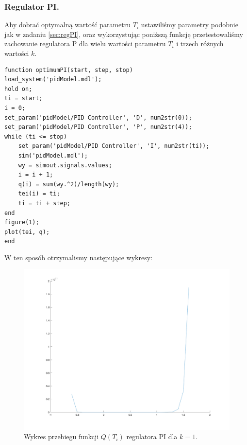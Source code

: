 \documentclass[a4paper,10pt]{article}
\begin{document}
\subsubsection{Regulator PI.}\label{sec:optPI}
Aby dobrać optymalną wartość parametru $T_{i}$ ustawiliśmy parametry podobnie jak w zadaniu \ref{sec:regPI}, oraz wykorzystując poniższą funkcję przetestowaliśmy zachowanie regulatora P dla wielu wartości parametru $T_{i}$ i trzech różnych wartości $k$. \\
\begin{lstlisting}[caption=Funkcja testująca regulator PI.]
function optimumPI(start, step, stop)
load_system('pidModel.mdl');
hold on;
ti = start;
i = 0;
set_param('pidModel/PID Controller', 'D', num2str(0));
set_param('pidModel/PID Controller', 'P', num2str(4));
while (ti <= stop)
	set_param('pidModel/PID Controller', 'I', num2str(ti));
	sim('pidModel.mdl');
	wy = simout.signals.values;
	i = i + 1;
	q(i) = sum(wy.^2)/length(wy);
	tei(i) = ti;
	ti = ti + step;
end
figure(1);
plot(tei, q);
end
\end{lstlisting}
W ten sposób otrzymalismy następujące wykresy: \\
\begin{figure}[!h]
    \centering
	\includegraphics[width=130mm]{PI-opt-k1.png}
	\caption{Wykres przebiegu funkcji $Q(T_{i})$ regulatora PI dla $k=1$.}
    \label{fig:regulatorPIk1opt1}
\end{figure}

\newpage
\end{document}
